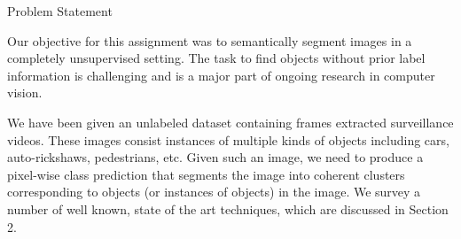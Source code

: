 \documentclass{article}
\begin{document}
\makeheader

\begin{ssection}{Problem Statement}

	Our objective for this assignment was to semantically segment images in a completely unsupervised setting. The task to find objects without prior label information is challenging and is a major part of ongoing research in computer vision.

	We have been given an unlabeled dataset containing frames extracted surveillance videos. These images consist instances of multiple kinds of objects including cars, auto-rickshaws, pedestrians, etc. Given such an image, we need to produce a pixel-wise class prediction that segments the image into coherent clusters corresponding to objects (or instances of objects) in the image. We survey a number of well known, state of the art techniques, which are discussed in Section 2.
\end{ssection}
\end{document}
